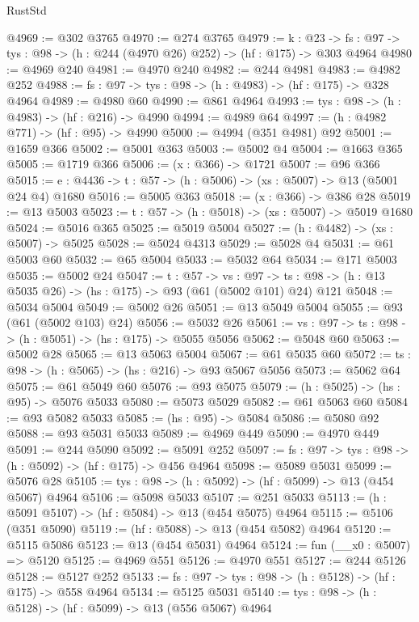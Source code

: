 \begin{lexlean}{RustStd}
\begin{coremodule}
@4969 := @302 @3765
@4970 := @274 @3765
@4979 := {k : @23} ->
  {fs : @97} -> {tys : @98} -> (h : @244 (@4970 @26) @252) -> (hf : @175) -> @303 @4964
@4980 := @4969 @240
@4981 := @4970 @240
@4982 := @244 @4981
@4983 := @4982 @252
@4988 := {fs : @97} -> {tys : @98} -> (h : @4983) -> (hf : @175) -> @328 @4964
@4989 := @4980 @60
@4990 := @861 @4964
@4993 := {tys : @98} -> (h : @4983) -> (hf : @216) -> @4990
@4994 := @4989 @64
@4997 := (h : @4982 @771) -> (hf : @95) -> @4990
@5000 := @4994 (@351 @4981) @92
@5001 := @1659 @366
@5002 := @5001 @363
@5003 := @5002 @4
@5004 := @1663 @365
@5005 := @1719 @366
@5006 := (x : @366) -> @1721
@5007 := @96 @366
@5015 := {e : @4436} -> {t : @57} -> (h : @5006) -> (xs : @5007) -> @13 (@5001 @24 @4) @1680
@5016 := @5005 @363
@5018 := (x : @366) -> @386 @28
@5019 := @13 @5003
@5023 := {t : @57} -> (h : @5018) -> (xs : @5007) -> @5019 @1680
@5024 := @5016 @365
@5025 := @5019 @5004
@5027 := (h : @4482) -> (xs : @5007) -> @5025
@5028 := @5024 @4313
@5029 := @5028 @4
@5031 := @61 @5003 @60
@5032 := @65 @5004
@5033 := @5032 @64
@5034 := @171 @5003
@5035 := @5002 @24
@5047 := {t : @57} ->
  {vs : @97} -> {ts : @98} -> (h : @13 @5035 @26) -> (hs : @175) -> @93 (@61 (@5002 @101) @24) @121
@5048 := @5034 @5004
@5049 := @5002 @26
@5051 := @13 @5049 @5004
@5055 := @93 (@61 (@5002 @103) @24)
@5056 := @5032 @26
@5061 := {vs : @97} -> {ts : @98} -> (h : @5051) -> (hs : @175) -> @5055 @5056
@5062 := @5048 @60
@5063 := @5002 @28
@5065 := @13 @5063 @5004
@5067 := @61 @5035 @60
@5072 := {ts : @98} -> (h : @5065) -> (hs : @216) -> @93 @5067 @5056
@5073 := @5062 @64
@5075 := @61 @5049 @60
@5076 := @93 @5075
@5079 := (h : @5025) -> (hs : @95) -> @5076 @5033
@5080 := @5073 @5029
@5082 := @61 @5063 @60
@5084 := @93 @5082 @5033
@5085 := (hs : @95) -> @5084
@5086 := @5080 @92
@5088 := @93 @5031 @5033
@5089 := @4969 @449
@5090 := @4970 @449
@5091 := @244 @5090
@5092 := @5091 @252
@5097 := {fs : @97} -> {tys : @98} -> (h : @5092) -> (hf : @175) -> @456 @4964
@5098 := @5089 @5031
@5099 := @5076 @28
@5105 := {tys : @98} -> (h : @5092) -> (hf : @5099) -> @13 (@454 @5067) @4964
@5106 := @5098 @5033
@5107 := @251 @5033
@5113 := (h : @5091 @5107) -> (hf : @5084) -> @13 (@454 @5075) @4964
@5115 := @5106 (@351 @5090)
@5119 := (hf : @5088) -> @13 (@454 @5082) @4964
@5120 := @5115 @5086
@5123 := @13 (@454 @5031) @4964
@5124 := fun (__x0 : @5007) => @5120
@5125 := @4969 @551
@5126 := @4970 @551
@5127 := @244 @5126
@5128 := @5127 @252
@5133 := {fs : @97} -> {tys : @98} -> (h : @5128) -> (hf : @175) -> @558 @4964
@5134 := @5125 @5031
@5140 := {tys : @98} -> (h : @5128) -> (hf : @5099) -> @13 (@556 @5067) @4964

\end{coremodule}
\end{lexlean}
